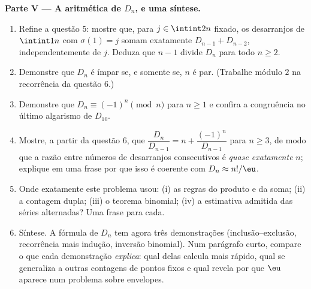 \begin{problem}
\medskip
\noindent\textbf{Parte V --- A aritmética de $D_n$, e uma
síntese.}
\begin{enumerate}
  \item Refine a questão 5: mostre que, para $j \in
        \intint2n$ fixado, os desarranjos de $\intint1n$ com
        $\sigma(1) = j$ somam exatamente $D_{n-1} + D_{n-2}$,
        independentemente de $j$. Deduza que $n - 1$ divide $D_n$
        para todo $n \geq 2$.
  \item Demonstre que $D_n$ é ímpar se, e somente se, $n$ é par.
        (Trabalhe módulo $2$ na recorrência da questão 6.)
  \item Demonstre que $D_n \equiv (-1)^n \pmod n$ para $n \geq 1$ e
        confira a congruência no último algarismo de $D_{10}$.
  \item Mostre, a partir da questão 6, que $\dfrac{D_n}{D_{n-1}} = n +
        \dfrac{(-1)^n}{D_{n-1}}$ para $n \geq 3$, de modo que a razão entre
        números de desarranjos consecutivos é \emph{quase exatamente}
        $n$; explique em uma frase por que isso é coerente com
        $D_n \approx n!/\eu$.
  \item Onde exatamente este problema usou: (i) as regras do produto e
        da soma; (ii) a contagem dupla; (iii) o teorema binomial;
        (iv) a estimativa admitida das séries alternadas? Uma frase
        para cada.
  \item Síntese. A fórmula de $D_n$ tem agora três demonstrações
        (inclusão--exclusão, recorrência mais indução, inversão
        binomial). Num parágrafo curto, compare o que cada demonstração
        \emph{explica}: qual delas calcula mais rápido, qual se
        generaliza a outras contagens de pontos fixos e qual revela
        por que $\eu$ aparece num problema sobre envelopes.
\end{enumerate}
\end{problem}
